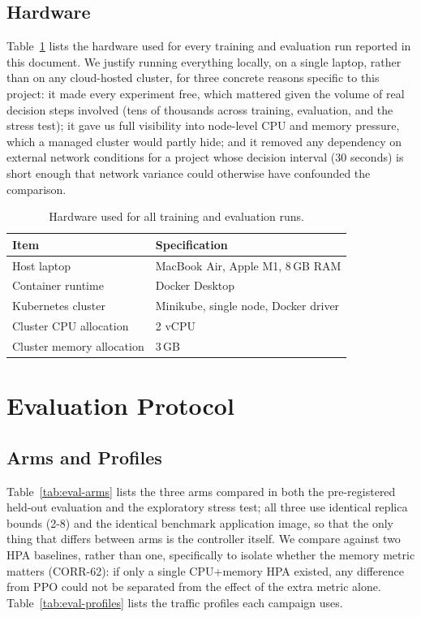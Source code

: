 \subsection{Hardware}
\label{sec:hardware}

Table~\ref{tab:hardware} lists the hardware used for every training and
evaluation run reported in this document. We justify running everything
locally, on a single laptop, rather than on any cloud-hosted cluster, for
three concrete reasons specific to this project: it made every experiment
free, which mattered given the volume of real decision steps involved
(tens of thousands across training, evaluation, and the stress test); it
gave us full visibility into node-level CPU and memory pressure, which a
managed cluster would partly hide; and it removed any dependency on
external network conditions for a project whose decision interval (30
seconds) is short enough that network variance could otherwise have
confounded the comparison.

\begin{table}[H]
\centering
\caption[Hardware used]{Hardware used for all training and evaluation runs.}
\label{tab:hardware}
\begin{tabular}{ll}
\toprule
Item & Specification \\
\midrule
Host laptop & MacBook Air, Apple M1, 8\,GB RAM \\
Container runtime & Docker Desktop \\
Kubernetes cluster & Minikube, single node, Docker driver \\
Cluster CPU allocation & 2 vCPU \\
Cluster memory allocation & 3\,GB \\
\bottomrule
\end{tabular}
\end{table}

\section{Evaluation Protocol}
\label{sec:eval-protocol}

\subsection{Arms and Profiles}

Table~\ref{tab:eval-arms} lists the three arms compared in both the
pre-registered held-out evaluation and the exploratory stress test; all
three use identical replica bounds (2-8) and the identical benchmark
application image, so that the only thing that differs between arms is the
controller itself. We compare against two HPA baselines, rather than one,
specifically to isolate whether the memory metric matters (CORR-62): if
only a single CPU+memory HPA existed, any difference from PPO could not be
separated from the effect of the extra metric alone. Table~\ref{tab:eval-profiles}
lists the traffic profiles each campaign uses.

